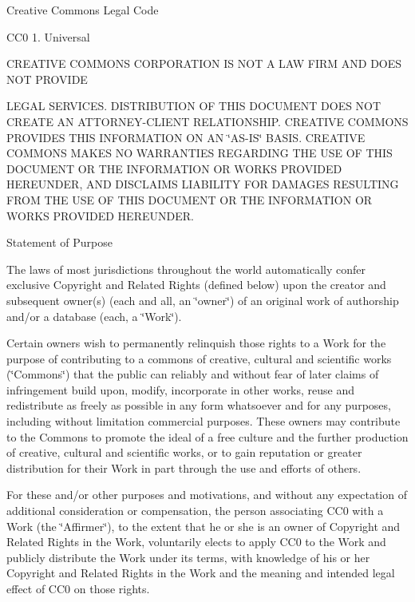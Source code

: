 Creative Commons Legal Code

C\+C0 1. Universal \begin{DoxyVerb}CREATIVE COMMONS CORPORATION IS NOT A LAW FIRM AND DOES NOT PROVIDE
\end{DoxyVerb}
 L\+E\+G\+AL S\+E\+R\+V\+I\+C\+ES. D\+I\+S\+T\+R\+I\+B\+U\+T\+I\+ON OF T\+H\+IS D\+O\+C\+U\+M\+E\+NT D\+O\+ES N\+OT C\+R\+E\+A\+TE AN A\+T\+T\+O\+R\+N\+E\+Y-\/\+C\+L\+I\+E\+NT R\+E\+L\+A\+T\+I\+O\+N\+S\+H\+IP. C\+R\+E\+A\+T\+I\+VE C\+O\+M\+M\+O\+NS P\+R\+O\+V\+I\+D\+ES T\+H\+IS I\+N\+F\+O\+R\+M\+A\+T\+I\+ON ON AN \char`\"{}\+A\+S-\/\+I\+S\char`\"{} B\+A\+S\+IS. C\+R\+E\+A\+T\+I\+VE C\+O\+M\+M\+O\+NS M\+A\+K\+ES NO W\+A\+R\+R\+A\+N\+T\+I\+ES R\+E\+G\+A\+R\+D\+I\+NG T\+HE U\+SE OF T\+H\+IS D\+O\+C\+U\+M\+E\+NT OR T\+HE I\+N\+F\+O\+R\+M\+A\+T\+I\+ON OR W\+O\+R\+KS P\+R\+O\+V\+I\+D\+ED H\+E\+R\+E\+U\+N\+D\+ER, A\+ND D\+I\+S\+C\+L\+A\+I\+MS L\+I\+A\+B\+I\+L\+I\+TY F\+OR D\+A\+M\+A\+G\+ES R\+E\+S\+U\+L\+T\+I\+NG F\+R\+OM T\+HE U\+SE OF T\+H\+IS D\+O\+C\+U\+M\+E\+NT OR T\+HE I\+N\+F\+O\+R\+M\+A\+T\+I\+ON OR W\+O\+R\+KS P\+R\+O\+V\+I\+D\+ED H\+E\+R\+E\+U\+N\+D\+ER.

Statement of Purpose

The laws of most jurisdictions throughout the world automatically confer exclusive Copyright and Related Rights (defined below) upon the creator and subsequent owner(s) (each and all, an \char`\"{}owner\char`\"{}) of an original work of authorship and/or a database (each, a \char`\"{}\+Work\char`\"{}).

Certain owners wish to permanently relinquish those rights to a Work for the purpose of contributing to a commons of creative, cultural and scientific works (\char`\"{}\+Commons\char`\"{}) that the public can reliably and without fear of later claims of infringement build upon, modify, incorporate in other works, reuse and redistribute as freely as possible in any form whatsoever and for any purposes, including without limitation commercial purposes. These owners may contribute to the Commons to promote the ideal of a free culture and the further production of creative, cultural and scientific works, or to gain reputation or greater distribution for their Work in part through the use and efforts of others.

For these and/or other purposes and motivations, and without any expectation of additional consideration or compensation, the person associating C\+C0 with a Work (the \char`\"{}\+Affirmer\char`\"{}), to the extent that he or she is an owner of Copyright and Related Rights in the Work, voluntarily elects to apply C\+C0 to the Work and publicly distribute the Work under its terms, with knowledge of his or her Copyright and Related Rights in the Work and the meaning and intended legal effect of C\+C0 on those rights.



